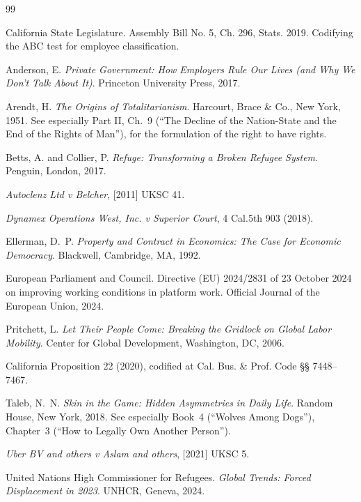 \documentclass[11pt,a4paper]{article}
\theoremstyle{remark}
\begin{document}

\begin{thebibliography}{99}

California State Legislature.
\newblock Assembly Bill No. 5, Ch. 296, Stats. 2019.
\newblock Codifying the ABC test for employee classification.

Anderson, E.
\newblock \emph{Private Government: How Employers Rule Our Lives
  (and Why We Don't Talk About It)}.
\newblock Princeton University Press, 2017.

Arendt, H.
\newblock \emph{The Origins of Totalitarianism}.
\newblock Harcourt, Brace \& Co., New York, 1951.
\newblock See especially Part II, Ch.~9 (``The Decline of the
  Nation-State and the End of the Rights of Man''), for the
  formulation of the right to have rights.

Betts, A. and Collier, P.
\newblock \emph{Refuge: Transforming a Broken Refugee System}.
\newblock Penguin, London, 2017.

\emph{Autoclenz Ltd v Belcher}, [2011] UKSC 41.

\emph{Dynamex Operations West, Inc. v Superior Court},
  4 Cal.5th 903 (2018).

Ellerman, D.~P.
\newblock \emph{Property and Contract in Economics: The Case for
  Economic Democracy}.
\newblock Blackwell, Cambridge, MA, 1992.

European Parliament and Council.
\newblock Directive (EU) 2024/2831 of 23 October 2024 on improving
  working conditions in platform work.
\newblock Official Journal of the European Union, 2024.

Pritchett, L.
\newblock \emph{Let Their People Come: Breaking the Gridlock on
  Global Labor Mobility}.
\newblock Center for Global Development, Washington, DC, 2006.

California Proposition 22 (2020), codified at Cal. Bus. \&
  Prof. Code §§ 7448--7467.

Taleb, N.~N.
\newblock \emph{Skin in the Game: Hidden Asymmetries in Daily Life}.
\newblock Random House, New York, 2018.
\newblock See especially Book~4 (``Wolves Among Dogs''), Chapter~3
  (``How to Legally Own Another Person'').

\emph{Uber BV and others v Aslam and others}, [2021] UKSC 5.

United Nations High Commissioner for Refugees.
\newblock \emph{Global Trends: Forced Displacement in 2023}.
\newblock UNHCR, Geneva, 2024.

\end{thebibliography}
\end{document}
